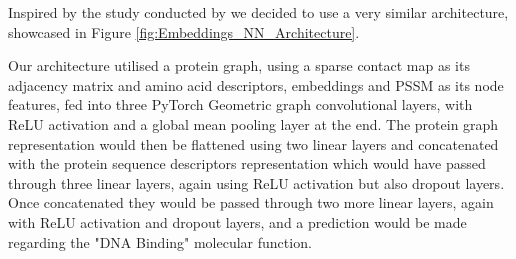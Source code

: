 Inspired by the study conducted by \citet{Jiang2020} we decided to use a very similar architecture, showcased in Figure \ref{fig:Embeddings_NN_Architecture}.

Our architecture utilised a protein graph, using a sparse contact map as its adjacency matrix and amino acid descriptors, embeddings and PSSM as its node features, fed into three PyTorch Geometric graph convolutional layers, with ReLU activation and a global mean pooling layer at the end. The protein graph representation would then be flattened using two linear layers and concatenated with the protein sequence descriptors representation which would have passed through three linear layers, again using ReLU activation but also dropout layers. Once concatenated they would be passed through two more linear layers, again with ReLU activation and dropout layers, and a prediction would be made regarding the "DNA Binding" molecular function.

